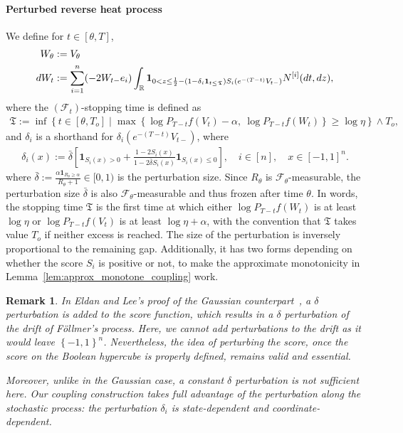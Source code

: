 \documentclass[11pt]{article}
\newcommand{\excess}{\alpha}
\newcommand{\bdelta}{\bar{\delta}}
\newcommand{\stopT}{{\boldsymbol{\mathfrak{T}}}}
\newcommand{\sF}{\mathscr{F}}
\newcommand{\uV}{V}
\newcommand{\uW}{W}
\newcommand{\To}{{T_o}}
\newcommand{\Ni}{N^{[i]}}
\theoremstyle{named}
\theoremstyle{plain}
\newtheorem{remark}{Remark}
\newcommand{\defn}{:=}
\newcommand{\real}{\ensuremath{\mathbb{R}}}
\newcommand{\brackets}[1]{\left[ #1 \right]}
\newcommand{\braces}[1]{\left\{ #1 \right \}}
\begin{document}
\paragraph{Perturbed reverse heat process}  We define for $t\in [\theta, T]$,
\begin{align}
  \label{eq:def_SDE_perturbed_reverse_process}
  \uW_\theta &\defn \uV_\theta \notag \\
  d \uW_t &\defn \sum_{i=1}^n (-2 \uW_{t-} e_i) \int_\real \mathbf{1}_{0 < z \leq \frac12 - (1-\delta_i  \mathbf{1}_{t \leq \stopT}) S_i(e^{-(T-t)}\uV_{t-})} \Ni(dt, dz),
\end{align}
where the $(\sF_t)$-stopping time is defined as
\begin{align}
  \label{eq:def_stopT}
  \stopT \defn \inf \braces{t \in [\theta, \To] \mid \max\braces{\log P_{T-t}f(\uV_t) - \excess,\ \log P_{T-t}f(\uW_t) } \geq \log \eta} \wedge \To,
\end{align}
and $\delta_i$ is a shorthand for $\delta_i (e^{-(T-t)}\uV_{t-})$, where 
\begin{align}
  \label{eq:def_delta_i}
  \delta_i(x) \defn  \bdelta  \brackets{\mathbf{1}_{S_i(x) > 0} + \frac{1-2 S_i(x)}{1 - 2 \bdelta S_i(x)} \mathbf{1}_{S_i(x) \leq 0}}, \quad i \in [n],\quad x\in [-1,1]^n.
\end{align}
where $\bdelta \defn \frac{\excess \mathbf{1}_{R_\theta \geq \excess}}{R_\theta + 1} \in [0, 1)$ is the perturbation size. Since $R_\theta$ is $\sF_\theta$-measurable, the perturbation size $\bdelta$ is also $\sF_\theta$-measurable and thus frozen after time $\theta$.
In words, the stopping time $\stopT$ is the first time at which either $\log P_{T-t}f(\uW_t)$ is at least $ \log \eta$ or $\log P_{T-t}f(\uV_t)$ is at least $\log \eta + \excess$, with the convention that $\stopT$ takes value $\To$ if neither excess is reached. The size of the perturbation is inversely proportional to the remaining gap. Additionally, it has two forms depending on whether the score $S_i$ is positive or not, to make the approximate monotonicity in Lemma~\ref{lem:approx_monotone_coupling} work.

\begin{remark}
  In Eldan and Lee's proof of the Gaussian counterpart~\cite{eldan2018regularization}, a $\delta$ perturbation is added to the score function, which results in a $\delta$ perturbation of the drift of F\"ollmer's process. Here, we cannot add perturbations to the drift as it would leave $\braces{-1,1}^n$. Nevertheless, the idea of perturbing the score, once the score on the Boolean hypercube is properly defined, remains valid and essential.
  
  Moreover, unlike in the Gaussian case, a constant $\delta$ perturbation is not sufficient here. Our coupling construction takes full advantage of the perturbation along the stochastic process: the perturbation $\delta_i$ is state-dependent and coordinate-dependent. 
\end{remark}
\end{document}
